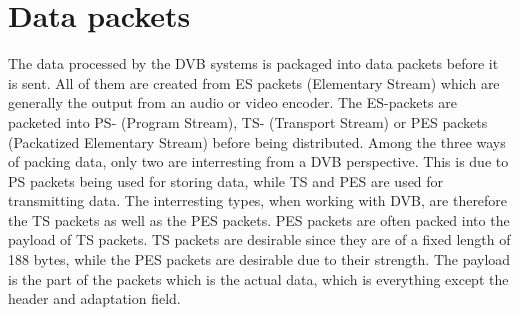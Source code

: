 


\section{Data packets}\label{sec:Data}
The data processed by the DVB systems is packaged into data packets 
before it is sent. All of them are created from ES packets 
(Elementary Stream) which are generally the output from an audio or 
video encoder. The ES-packets are packeted into PS- (Program Stream), 
TS- (Transport Stream) or PES packets (Packatized Elementary Stream) 
before being distributed. Among the three ways of packing data, only 
two are interresting from a DVB perspective. This is due to PS packets 
being used for storing data, while TS and PES are used for 
transmitting data. The interresting types, when working with DVB, are 
therefore the TS packets as well as the PES packets. PES packets are 
often packed into the payload of TS packets. TS packets are desirable 
since they are of a fixed length of 188 bytes, while the PES packets 
are desirable due to their strength. The payload is the part of the 
packets which is the actual data, which is everything except the 
header and adaptation field.

